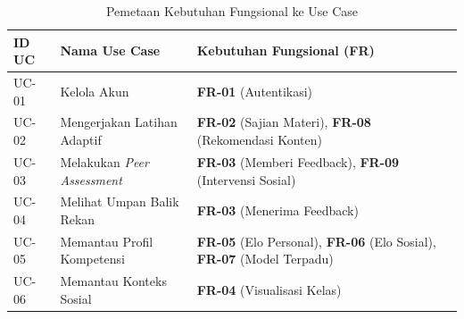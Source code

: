\begin{table}[H]
    \centering
    \caption{Pemetaan Kebutuhan Fungsional ke Use Case}
    \label{tbl:mapping_fr_uc}
    \begin{tabular}{|p{}|p{}|p{}|}
        \hline
        \textbf{ID UC} & \textbf{Nama Use Case} & \textbf{Kebutuhan Fungsional (FR)} \\
        \hline
        UC-01 & Kelola Akun & \textbf{FR-01} (Autentikasi) \\
        \hline
        UC-02 & Mengerjakan Latihan Adaptif & \textbf{FR-02} (Sajian Materi), \textbf{FR-08} (Rekomendasi Konten) \\
        \hline
        UC-03 & Melakukan \textit{Peer Assessment} & \textbf{FR-03} (Memberi Feedback), \textbf{FR-09} (Intervensi Sosial) \\
        \hline
        UC-04 & Melihat Umpan Balik Rekan & \textbf{FR-03} (Menerima Feedback) \\
        \hline
        UC-05 & Memantau Profil Kompetensi & \textbf{FR-05} (Elo Personal), \textbf{FR-06} (Elo Sosial), \textbf{FR-07} (Model Terpadu) \\
        \hline
        UC-06 & Memantau Konteks Sosial & \textbf{FR-04} (Visualisasi Kelas) \\
        \hline
    \end{tabular}
\end{table}